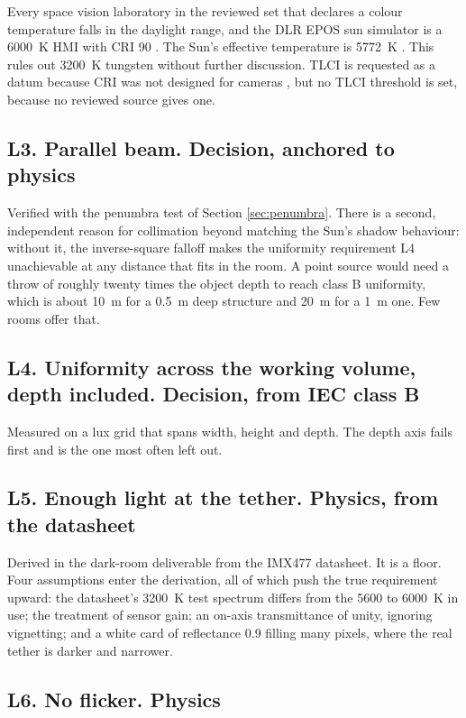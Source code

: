 Every space vision laboratory in the reviewed set that declares a colour
temperature falls in the daylight range, and the DLR EPOS sun simulator is a
6000~K HMI with CRI 90 \cite{dlr2025eposportfolio, benninghoff2017epos}. The
Sun's effective temperature is 5772~K \cite{prsa2016iau}. This rules out
3200~K tungsten without further discussion. TLCI is requested as a datum
because CRI was not designed for cameras \cite{ebu_tech3355}, but no TLCI
threshold is set, because no reviewed source gives one.

\subsection*{L3. Parallel beam. \textnormal{Decision, anchored to physics}}

Verified with the penumbra test of Section \ref{sec:penumbra}. There is a
second, independent reason for collimation beyond matching the Sun's shadow
behaviour: without it, the inverse-square falloff makes the uniformity
requirement L4 unachievable at any distance that fits in the room. A point
source would need a throw of roughly twenty times the object depth to reach
class B uniformity, which is about 10~m for a 0.5~m deep structure and 20~m
for a 1~m one. Few rooms offer that.

\subsection*{L4. Uniformity across the working volume, depth included.
\textnormal{Decision, from IEC class B}}

Measured on a lux grid that spans width, height and depth. The depth axis
fails first and is the one most often left out.

\subsection*{L5. Enough light at the tether. \textnormal{Physics, from the
datasheet}}

Derived in the dark-room deliverable from the IMX477 datasheet. It is a
floor. Four assumptions enter the derivation, all of which push the true
requirement upward: the datasheet's 3200~K test spectrum differs from the
5600 to 6000~K in use; the treatment of sensor gain; an on-axis transmittance
of unity, ignoring vignetting; and a white card of reflectance 0.9 filling
many pixels, where the real tether is darker and narrower.

\subsection*{L6. No flicker. \textnormal{Physics}}

